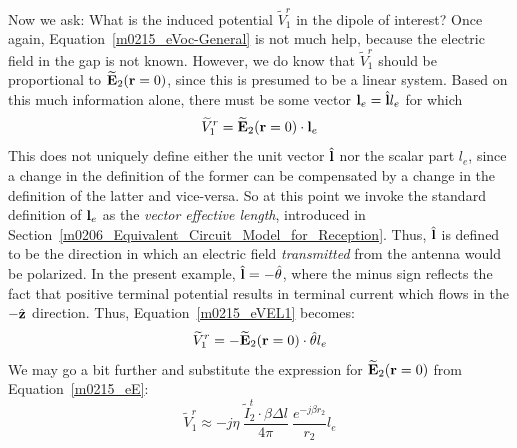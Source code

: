 Now we ask: What is the induced potential $\widetilde{V}_1^r$ in the dipole of interest?
Once again, Equation~\ref{m0215_eVoc-General} is not much help, because the electric field in the gap is not known.
However, we do know that $\widetilde{V}_1^r$ should be proportional to $\widetilde{\bf E}_2({\bf r}=0)$, since this is presumed to be a linear system.
Based on this much information alone, there must be some vector ${\bf l}_e=\hat{\bf l} l_e$ for which
%
\begin{equation}
\widetilde{V}_1^r = \widetilde{\bf E}_2({\bf r}=0) \cdot {\bf l}_e
\label{m0215_eVEL1}
\end{equation}
%
This does not uniquely define either the unit vector $\hat{\bf l}$ nor the scalar part $l_e$, since a change in the definition of the former can be compensated by a change in the definition of the latter and vice-versa.
So at this point we invoke the standard definition of ${\bf l}_e$ as the \emph{vector effective length},
introduced in Section~\ref{m0206_Equivalent_Circuit_Model_for_Reception}.
Thus, $\hat{\bf l}$ is defined to be the direction in which an electric field \emph{transmitted} from the antenna would be polarized.
In the present example, $\hat{\bf l}=-\hat{\bf \theta}$, where the minus sign reflects the fact that positive terminal potential results in terminal current which flows in the $-\hat{\bf z}$ direction. 
Thus, Equation~\ref{m0215_eVEL1} becomes:
%
\begin{equation}
\widetilde{V}_1^r = -\widetilde{\bf E}_2({\bf r}=0) \cdot \hat{\bf \theta} l_e
\end{equation}
%
We may go a bit further and substitute the expression for $\widetilde{\bf E}_2({\bf r}=0)$ from Equation~\ref{m0215_eE}:
%
\begin{equation}
\widetilde{V}_1^r \approx - j\eta~\frac{\widetilde{I}_2^t\cdot\beta \Delta l}{4\pi}~\frac{e^{-j\beta r_2}}{r_2} l_e
\label{m0215_eV1r1}
\end{equation}

